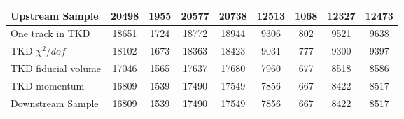 \begin{landscape}
\begin{table}
\begin{tabular}[pos]{l|cccccccc}
\hline                                            
Upstream Sample                                    &   20498  &    1955  &   20577  &   20738  &   12513  &    1068  &   12327  &   12473  \\
\hline                                            
One track in TKD                                   &   18651  &    1724  &   18772  &   18944  &    9306  &     802  &    9521  &    9638  \\
TKD $\chi^2/dof$                                   &   18102  &    1673  &   18363  &   18423  &    9031  &     777  &    9300  &    9397  \\
TKD fiducial volume                                &   17046  &    1565  &   17637  &   17680  &    7960  &     677  &    8518  &    8586  \\
TKD momentum                                       &   16809  &    1539  &   17490  &   17549  &    7856  &     667  &    8422  &    8517  \\
\hline                                            
Downstream Sample                                  &   16809  &    1539  &   17490  &   17549  &    7856  &     667  &    8422  &    8517  \\
\hline                                            

\end{tabular}
\end{table}
\end{landscape}

